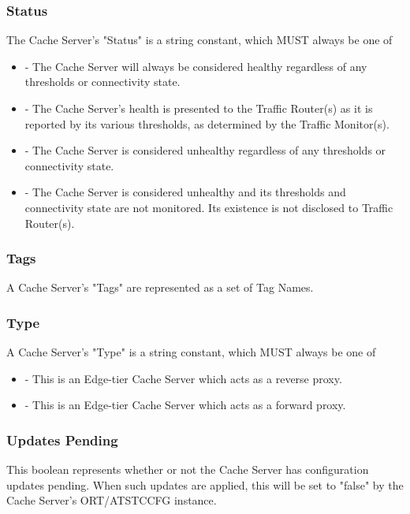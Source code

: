 \subsubsection{Status}
The Cache Server's "Status" is a string constant, which MUST always be one of

\begin{itemize}
	\item {} - The Cache Server will always be considered healthy
	regardless of any thresholds or connectivity state.
	\item {} - The Cache Server's health is presented to the
	Traffic Router(s) as it is reported by its various thresholds, as determined
	by the Traffic Monitor(s).
	\item {} - The Cache Server is considered unhealthy regardless
	of any thresholds or connectivity state.
	\item {} - The Cache Server is considered unhealthy and its
	thresholds and connectivity state are not monitored. Its existence is not
	disclosed to Traffic Router(s).
\end{itemize}

\subsubsection{Tags}
A Cache Server's "Tags" are represented as a set of Tag Names.

\subsubsection{Type}
A Cache Server's "Type" is a string constant, which MUST always be one of

\begin{itemize}
	\item {} - This is an Edge-tier Cache Server which acts as a
	reverse proxy.
	\item {} - This is an Edge-tier Cache Server which acts as a forward
	proxy.
\end{itemize}

\subsubsection{Updates Pending}
This boolean represents whether or not the Cache Server has configuration
updates pending. When such updates are applied, this will be set to "false" by
the Cache Server's ORT/ATSTCCFG instance.


